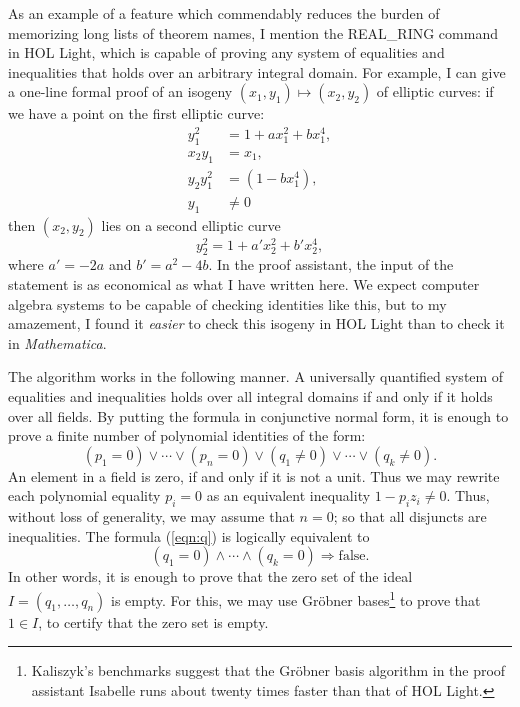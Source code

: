 \documentclass{llncs}
\begin{document}
As an example of a feature which commendably reduces the burden of
memorizing long lists of theorem names, I mention the {REAL\_RING}
command in HOL Light, which is capable of proving any system of
equalities and inequalities that holds over an arbitrary integral
domain.  For example, I can give a one-line formal proof of  an isogeny
$(x_1,y_1) \mapsto (x_2,y_2)$ of elliptic curves: if we have a point
on the first elliptic curve:
\begin{align*}
y_1^2 &= 1 + a x_1^2 + b x_1^4,\\
x_2 y_1&=x_1,\\
y_2 y_1^2&=(1 - b x_1^4),\\  %
y_1&\ne 0
\end{align*}
then $(x_2,y_2)$ lies on a second elliptic curve
\[
y_2^2 = 1 + a' x_2^2 + b' x_2^4,  
\]
where $a' = -2a$ and $b' = a^2 - 4b$.  In the proof assistant, 
the input of the
statement is as economical as what I have written here. We expect computer
algebra systems to be capable of checking identities like this, but to
my amazement, I found it {\it easier} to check this isogeny in HOL
Light than to check it in {\it Mathematica}.

The algorithm works in the following manner.  A universally quantified
system of equalities and inequalities holds over all integral domains
if and only if it holds over all fields.  By putting the formula in
conjunctive normal form, it is enough to prove a finite number of
polynomial identities of the form:
\begin{equation}\label{eqn:q}
(p_1=0) \lor \cdots \lor (p_n=0) \lor (q_1\ne 0) \lor\cdots\lor (q_k\ne 0).
\end{equation}
An element in a field is zero, if and only if it is not a unit.  Thus
we may rewrite each polynomial equality $p_i=0$ as an equivalent
inequality $1-p_i z_i\ne 0$.  Thus, without loss of generality, we may
assume that $n=0$; so that all disjuncts are inequalities.  The
formula (\ref{eqn:q}) is logically equivalent to
\[
(q_1 =0) \land \cdots \land (q_k = 0) \Longrightarrow \text{false}.
\]
In other words, it is enough to prove that the zero set of the ideal
$I=(q_1,\ldots,q_n)$ is empty.  For this, we may use
Gr\"obner bases\footnote{Kaliszyk's benchmarks suggest that the
  Gr\"obner basis algorithm in the proof assistant Isabelle runs about
  twenty times faster than that of HOL Light.
}  to prove that $1\in I$, to certify that
the zero set is empty.  
\end{document}
